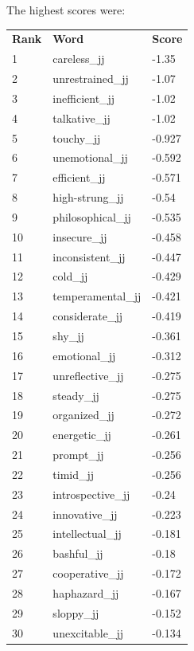 \documentclass[10pt,letterpaper]{book}
\begin{document}
The highest scores were:
\begin{tabular}{ l l l }
        \textbf{Rank} & \textbf{Word} & \textbf{Score} \\
        1 & careless\_jj & -1.35 \\
        2 & unrestrained\_jj & -1.07 \\
        3 & inefficient\_jj & -1.02 \\
        4 & talkative\_jj & -1.02 \\
        5 & touchy\_jj & -0.927 \\
        6 & unemotional\_jj & -0.592 \\
        7 & efficient\_jj & -0.571 \\
        8 & high-strung\_jj & -0.54 \\
        9 & philosophical\_jj & -0.535 \\
        10 & insecure\_jj & -0.458 \\
        11 & inconsistent\_jj & -0.447 \\
        12 & cold\_jj & -0.429 \\
        13 & temperamental\_jj & -0.421 \\
        14 & considerate\_jj & -0.419 \\
        15 & shy\_jj & -0.361 \\
        16 & emotional\_jj & -0.312 \\
        17 & unreflective\_jj & -0.275 \\
        18 & steady\_jj & -0.275 \\
        19 & organized\_jj & -0.272 \\
        20 & energetic\_jj & -0.261 \\
        21 & prompt\_jj & -0.256 \\
        22 & timid\_jj & -0.256 \\
        23 & introspective\_jj & -0.24 \\
        24 & innovative\_jj & -0.223 \\
        25 & intellectual\_jj & -0.181 \\
        26 & bashful\_jj & -0.18 \\
        27 & cooperative\_jj & -0.172 \\
        28 & haphazard\_jj & -0.167 \\
        29 & sloppy\_jj & -0.152 \\
        30 & unexcitable\_jj & -0.134 \\
\end{tabular}
\end{document}
